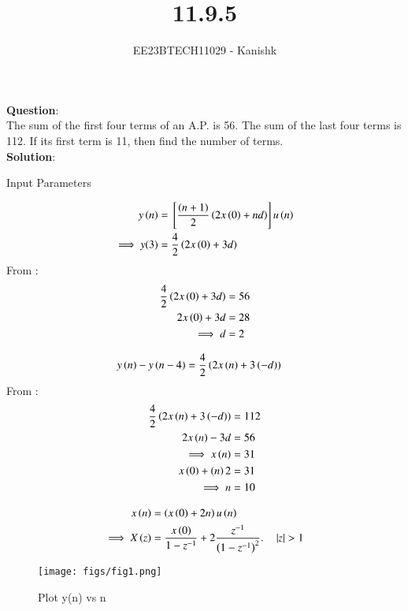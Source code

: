 \documentclass[journal,12pt,twocolumn]{IEEEtran}
\theoremstyle{remark}
\begin{document}

\vspace{3cm}

\title{11.9.5}
\author{EE23BTECH11029 - Kanishk}
\maketitle

\bigskip


\textbf{Question}:\\ 
The sum of the first four terms of an A.P. is 56. The sum of the last four terms is
112. If its first term is 11, then find the number of terms.\\

\textbf{Solution}:\\ 

\begin{table}[ht]
    \centering
    \def\arraystretch{1.5}
    
   \caption{Input Parameters}
   \label{tab:11.9.5.12}
\end{table}

\small
\begin{align}
y\left(n\right)&={}\left[\frac{\left(n+1\right)}{2}\left(2x\left(0\right)+nd\right)\right]u\left(n\right)\\
\implies y(3)&=\frac{4}{2}\left(2x\left(0\right)+3d\right)\\
\end{align}
From :
\begin{align}
\frac{4}{2}\left(2x\left(0\right)+3d\right)&=56\\
2x\left(0\right)+3d&=28\\
\implies d&=2
\end{align}

\begin{align}
 y\left(n\right)-y\left(n-4\right)&=\frac{4}{2}\left(2x\left(n\right)+3\left(-d\right)\right)
\end{align}
From :
\begin{align}
\frac{4}{2}\left(2x\left(n\right)+3\left(-d\right)\right)&=112\\
2x\left(n\right)-3d&=56\\
\implies x\left(n\right)&=31\\
x\left(0\right)+\left(n\right)2&=31\\
\implies n&=10
\end{align}


\begin{align}
x\left(n\right)&=\left(x\left(0\right)+2n\right)u\left(n\right)\\
\implies X\left(z\right)&=\frac{x\left(0\right)}{1-z^{-1}}+2\frac{z^{-1}}{\left(1-z^{-1}\right)^{2}}.\quad \left\vert z\right\vert > 1
\end{align}

\newpage

\begin{figure}
    
    \texttt{[image: figs/fig1.png]}
    \caption{Plot y(n) vs n}
\end{figure}
\end{document}
